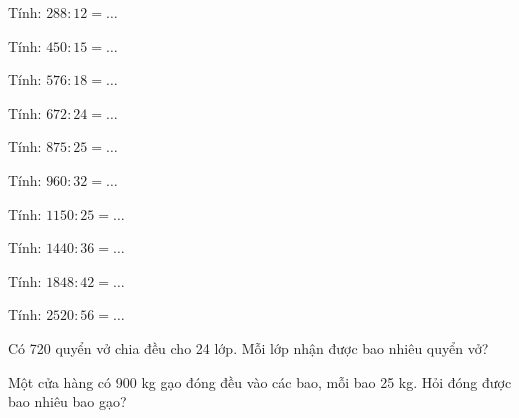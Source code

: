 \begin{ex}
Tính: $288 : 12 = \dots$
\end{ex}

\begin{ex}
Tính: $450 : 15 = \dots$
\end{ex}

\begin{ex}
Tính: $576 : 18 = \dots$
\end{ex}

\begin{ex}
Tính: $672 : 24 = \dots$
\end{ex}

\begin{ex}
Tính: $875 : 25 = \dots$
\end{ex}

\begin{ex}
Tính: $960 : 32 = \dots$
\end{ex}

\begin{ex}
Tính: $1150 : 25 = \dots$
\end{ex}

\begin{ex}
Tính: $1440 : 36 = \dots$
\end{ex}

\begin{ex}
Tính: $1848 : 42 = \dots$
\end{ex}

\begin{ex}
Tính: $2520 : 56 = \dots$
\end{ex}

\begin{ex}
Có 720 quyển vở chia đều cho 24 lớp. Mỗi lớp nhận được bao nhiêu quyển vở?
\end{ex}

\begin{ex}
Một cửa hàng có 900 kg gạo đóng đều vào các bao, mỗi bao 25 kg. Hỏi đóng được bao nhiêu bao gạo?
\end{ex}

